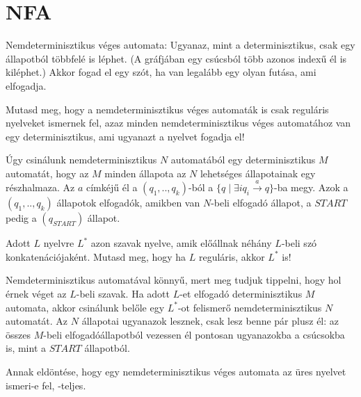 	
	\section{NFA}
	
	 Nemdeterminisztikus véges automata: Ugyanaz, mint a determinisztikus, csak egy állapotból többfelé is léphet. (A gráfjában egy csúcsból több azonos indexű él is kiléphet.) Akkor fogad el egy szót, ha van legalább egy olyan futása, ami elfogadja.
	
	\begin{Exercise}[counter={sorszam}, difficulty=0]
		Mutasd meg, hogy a nemdeterminisztikus v\'eges automaták is csak reguláris nyelveket ismernek fel, azaz minden nemdeterminisztikus véges automatához van egy determinisztikus, ami ugyanazt a nyelvet fogadja el!
	\end{Exercise}	
	\begin{Answer}
		\'Ugy csin\'alunk nemdeterminisztikus $N$ automat\'ab\'ol egy determinisztikus $M$ automat\'at, hogy az $M$ minden \'allapota az $N$ lehets\'eges \'allapotainak egy r\'eszhalmaza. Az $a$ c\'imk\'ej\H u \'el a $(q_1,..,q_k)$-b\'ol
		a $\{q\mid \exists i q_i \stackrel a\to q\}$-ba megy.
		Azok a $(q_1,..,q_k)$ \'allapotok elfogad\'ok, amikben van $N$-beli elfogad\'o \'allapot, a $START$ pedig a $(q_{START})$ \'allapot.
	\end{Answer}
	
	\begin{Exercise}[counter={sorszam}, difficulty=0]
		Adott $L$ nyelvre $L^*$ azon szavak nyelve, amik előállnak néhány $L$-beli szó konkatenációjaként. Mutasd meg, hogy ha $L$ reguláris, akkor $L^*$ is!
	\end{Exercise}	
	\begin{Answer}
		Nemdeterminisztikus automat\'aval k\"onny\H u, mert meg tudjuk tippelni, hogy hol \'ernek v\'eget az $L$-beli szavak.
		Ha adott $L$-et elfogad\'o determinisztikus $M$ automata, akkor csin\'alunk bel\H ole egy $L^*$-ot felismer\H o nemdeterminisztikus $N$ automat\'at. Az $N$ \'allapotai ugyanazok lesznek, csak lesz benne p\'ar plusz \'el: az \"osszes $M$-beli elfogad\'o\'allapotb\'ol vezessen \'el pontosan ugyanazokba a cs\'ucsokba is, mint a $START$ \'allapotb\'ol.
	\end{Answer}

	\begin{Exercise}[counter={sorszam}, difficulty=0]
		Annak eldöntése, hogy egy nemdeterminisztikus véges automata az üres nyelvet
		ismeri-e fel, \NL-teljes.
	\end{Exercise}
	
